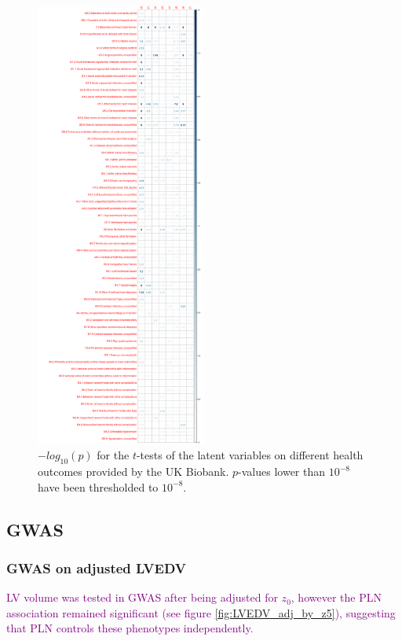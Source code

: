 \documentclass[fleqn,10pt]{wlscirep}
\begin{document}
\begin{figure}
\includegraphics[width=0.5\textwidth]{figs/diseases/experiment_2_health_outcome_t-test}
\caption{$-log_{10}(p)$ for the $t$-tests of the latent variables on different health outcomes provided by the UK Biobank. $p$-values lower than $10^{-8}$ have been thresholded to $10^{-8}$.}
\label{fig:health_outcomes}
\end{figure}


\subsection{GWAS}

\subsubsection{GWAS on adjusted LVEDV}
\textcolor{purple}{LV volume was tested in GWAS after being adjusted for $z_0$, however the PLN association remained significant (see figure \ref{fig:LVEDV_adj_by_z5}), suggesting that PLN controls these phenotypes independently.}
\end{document}
